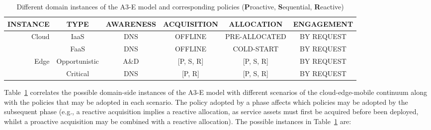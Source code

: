 %
%
%
%
%
%
%



\begin{center}
\begin{table}[htbp]
\small
\caption{Different domain instances of the A3-E model and  corresponding policies (\textbf{P}roactive, \textbf{S}equential, \textbf{R}eactive)}\label{tab:A3-E-instances}
\begin{tabular}{ r c c c c c }
\toprule

INSTANCE & TYPE & \textbf{A}WARENESS & \textbf{A}CQUISITION	& \textbf{A}LLOCATION 	& \textbf{E}NGAGEMENT  	\\

\midrule

\multirow{2}{*}{ Cloud }
& IaaS	& DNS	& OFFLINE		& PRE-ALLOCATED	& BY REQUEST\\
& FaaS		& DNS	& OFFLINE		& COLD-START	& BY REQUEST\\\midrule					
\multirow{2}{*}{ Edge }
& Opportunistic		& A\&D	& [P, S, R]		& [P, S, R]		& BY REQUEST\\	
& Critical		& DNS	& [P, R]		& [P, S, R] 	& BY REQUEST\\

\bottomrule
\end{tabular}
\end{table}
\end{center}
\normalsize

Table~\ref{tab:A3-E-instances} correlates the possible domain-side instances of the A3-E model with different scenarios of the cloud-edge-mobile continuum along with the policies that may be adopted in each scenario. The policy adopted by a phase affects which policies may be adopted by the subsequent phase (e.g., a reactive acquisition implies a reactive allocation, as service assets must first be acquired before been deployed, whilst a proactive acquisition may be combined with a reactive allocation). The possible instances in Table~\ref{tab:A3-E-instances} are:

